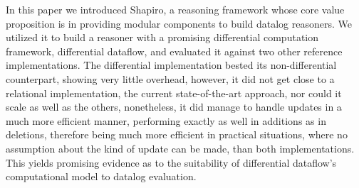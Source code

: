 \documentclass[sigconf,screen,review,natbib]{acmart}
\theoremstyle{definition}
\begin{document}
In this paper we introduced Shapiro, a reasoning framework whose core value proposition is in providing modular components to build datalog reasoners. We utilized it to build a reasoner with a promising differential computation framework, differential dataflow, and evaluated it against two other reference implementations. The differential implementation bested its non-differential counterpart, showing very little overhead, however, it did not get close to a relational implementation, the current state-of-the-art approach, nor could it scale as well as the others, nonetheless, it did manage to handle updates in a much more efficient manner, performing exactly as well in additions as in deletions, therefore being much more efficient in practical situations, where no assumption about the kind of update can be made, than both implementations. This yields promising evidence as to the suitability of differential dataflow's computational model to datalog evaluation.
%
%
%
\end{document}
